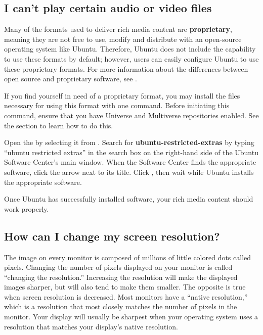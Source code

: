 \subsection{I can't play certain audio or video files}

Many of the formats used to deliver rich media content are \textbf{proprietary}, meaning they are not free to use, modify and distribute with an open-source operating system like Ubuntu. Therefore, Ubuntu does not include the capability to use these formats by default; however, users can easily configure Ubuntu to use these proprietary formats. For more information about the differences between open source and proprietary software, see .

If you find yourself in need of a proprietary format, you may install the files necessary for using this format with one command. Before initiating this command, ensure that you have Universe and Multiverse repositories enabled. See the  section to learn how to do this.

Open the  by selecting it from .
Search for \textbf{ubuntu-restricted-extras} by typing ``ubuntu restricted extras'' in the search box on the right-hand side of the Ubuntu Software Center's main window.
When the Software Center finds the appropriate software, click the arrow next to its title.
Click , then wait while Ubuntu installs the appropriate software.

Once Ubuntu has successfully installed software, your rich media content should work properly.

\subsection{How can I change my screen resolution?}

The image on every monitor is composed of millions of little colored dots called pixels. Changing the number of pixels displayed on your monitor is called ``changing the resolution.'' Increasing the resolution will make the displayed images sharper, but will also tend to make them smaller. The opposite is true when screen resolution is decreased. Most monitors have a ``native resolution,'' which is a resolution that most closely matches the number of pixels in the monitor. Your display will usually be sharpest when your operating system uses a resolution that matches your display's native resolution.

